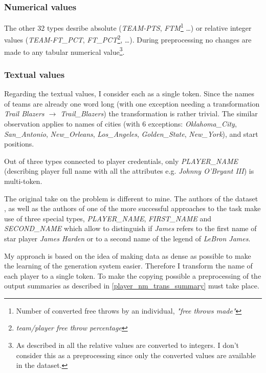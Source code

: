 \subsubsection{Numerical values}

The other 32 types desribe absolute (\emph{TEAM-PTS}, \emph{FTM}\footnote{Number of converted free throws by an individual, \emph{"free throws made"}} \dots) or relative integer values (\emph{TEAM-FT\_PCT}, \emph{FT\_PCT}\footnote{\emph{team/player free throw percentage}}, \dots). During preprocessing no changes are made to any tabular numerical value\footnote{As described in \citep{wiseman2017} all the relative values are converted to integers. I don't consider this as a preprocessing since only the converted values are available in the dataset.}.

\subsubsection{Textual values} \label{trans_p_nms}

Regarding the textual values, I consider each as a single token. Since the names of teams are already one word long (with one exception needing a transformation \emph{Trail Blazers $\rightarrow$ Trail\_Blazers}) the transformation is rather trivial. The similar observation applies to names of cities (with 6 exceptions: \emph{Oklahoma\_City}, \emph{San\_Antonio}, \emph{New\_Orleans}, \emph{Los\_Angeles}, \emph{Golden\_State}, \emph{New\_York}), and start positions.

Out of three types connected to player credentials, only \emph{PLAYER\_NAME} (describing player full name with all the attributes e.g. \emph{Johnny O'Bryant III}) is multi-token.

The original take on the problem is different to mine. The authors of the dataset \citep{wiseman2017}, as well as the authors of one of the more successful approaches to the task \citep{puduppully2019datatotext} make use of three special types, \emph{PLAYER\_NAME}, \emph{FIRST\_NAME} and \emph{SECOND\_NAME} which allow to distinguish if \emph{James} refers to the first name of star player \emph{James Harden} or to a second name of the legend of \emph{LeBron James}.

My approach is based on the idea of making data as dense as possible to make the learning of the generation system easier. Therefore I transform the name of each player to a single token. To make the copying possible a preprocessing of the output summaries as described in \ref{player_nm_trans_summary} must take place. 

